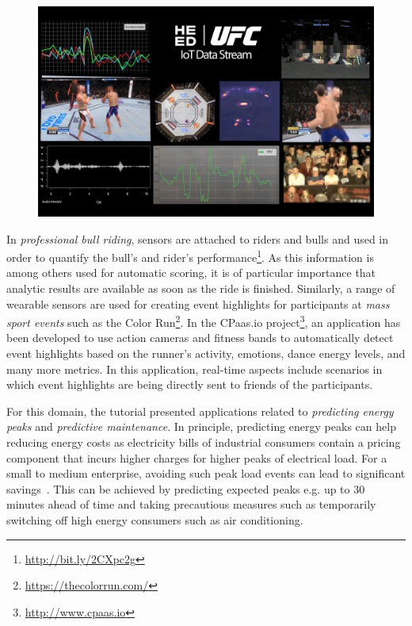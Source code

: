 \begin{figure}[t]
\includegraphics[scale=0.15]{pictures/DP6L8S9XkAYFMCw.jpg}
\label{FIG:FightStreams}
\end{figure}

In \emph{professional bull riding}, sensors are attached to riders and bulls and used in order to quantify the bull's and rider's performance\footnote{\url{http://bit.ly/2CXpc2g}}. As this information is among others used for automatic scoring, it is of particular importance that analytic results are available as soon as the ride is finished. Similarly, a range of wearable sensors are used for creating event highlights for participants at \emph{mass sport events} such as the Color Run\footnote{\url{https://thecolorrun.com/}}. In the \textsf{CPaas.io} project\footnote{\url{http://www.cpaas.io}}, an application has been developed to use action cameras and fitness bands to automatically detect event highlights based on the runner's activity, emotions, dance energy levels, and many more metrics. In this application, real-time aspects include scenarios in which event highlights are being directly sent to friends of the participants.

For this domain, the tutorial presented applications related to \emph{predicting energy peaks} and \emph{predictive maintenance}. In principle, predicting energy peaks can help reducing energy costs as electricity bills of industrial consumers contain a pricing component that incurs higher charges for higher peaks of electrical load. For a small to medium enterprise, avoiding such peak load events can lead to significant savings~\cite{strohbach_and_toll_2016}. This can be achieved by predicting expected peaks e.g. up to 30 minutes ahead of time and taking precautious measures such as temporarily switching off high energy consumers such as air conditioning.

